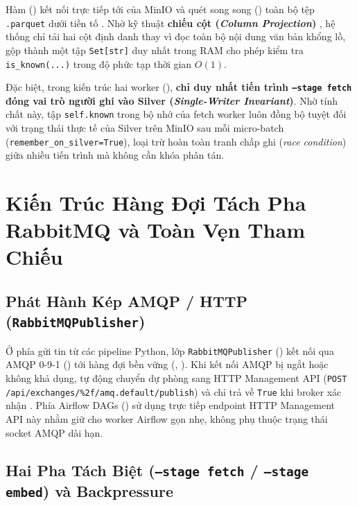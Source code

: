 Hàm  () kết nối trực tiếp tới  của MinIO và quét song song () toàn bộ tệp \texttt{.parquet} dưới tiền tố . Nhờ kỹ thuật \textbf{chiếu cột (\textit{Column Projection})} , hệ thống chỉ tải hai cột định danh thay vì đọc toàn bộ nội dung văn bản khổng lồ, gộp thành một tập \texttt{Set[str]} duy nhất trong RAM cho phép kiểm tra \texttt{is\_known(...)} trong độ phức tạp thời gian $O(1)$.

Đặc biệt, trong kiến trúc hai worker (), \textbf{chỉ duy nhất tiến trình \texttt{--stage fetch} đóng vai trò người ghi vào Silver (\textit{Single-Writer Invariant})}. Nhờ tính chất này, tập \texttt{self.known} trong bộ nhớ của fetch worker luôn đồng bộ tuyệt đối với trạng thái thực tế của Silver trên MinIO sau mỗi micro-batch (\texttt{remember\_on\_silver=True}), loại trừ hoàn toàn tranh chấp ghi (\textit{race condition}) giữa nhiều tiến trình mà không cần khóa phân tán.

\section{Kiến Trúc Hàng Đợi Tách Pha RabbitMQ và Toàn Vẹn Tham Chiếu}
\label{sec:ch2_rabbitmq}

\subsection{Phát Hành Kép AMQP / HTTP (\texttt{RabbitMQPublisher})}
\label{sec:ch2_publisher}

Ở phía gửi tin từ các pipeline Python, lớp \texttt{RabbitMQPublisher} () kết nối qua AMQP 0-9-1 () tới hàng đợi bền vững  (, ). Khi kết nối AMQP bị ngắt hoặc không khả dụng,  tự động chuyển dự phòng sang HTTP Management API (\texttt{POST /api/exchanges/\%2f/\allowbreak amq.default/publish}) và chỉ trả về \texttt{True} khi broker xác nhận . Phía Airflow DAGs () sử dụng trực tiếp endpoint HTTP Management API này nhằm giữ cho worker Airflow gọn nhẹ, không phụ thuộc trạng thái socket AMQP dài hạn.

\subsection{Hai Pha Tách Biệt (\texttt{--stage fetch} / \texttt{--stage embed}) và Backpressure}
\label{sec:ch2_two_stage}

